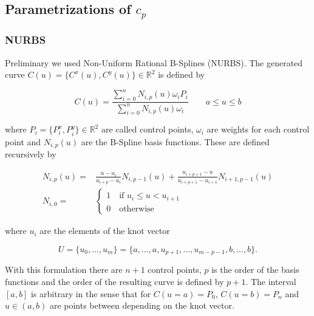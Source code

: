 \documentclass{scrartcl}[12pt, halfparskip]
\numberwithin{equation}{section}
\numberwithin{figure}{section}
\numberwithin{table}{section}
\begin{document}
\subsection{Parametrizations of $c_p$}
\label{sec:parametrizations}

\subsubsection{NURBS}
\label{sec:nurbs}
Preliminary we used Non-Uniform Rational B-Splines (NURBS). The generated curve $C(u) = \{C^x(u), C^y(u) \} \in \mathbb{R}^2$ is defined by

\begin{equation}
	C(u) = \frac{\sum_{i=0}^{n} N_{i,p}(u) \omega_i P_i }{\sum_{i=0}^{n} N_{i,p}(u) \omega_i} \qquad a \le u \le b
\end{equation}

where $P_i = \{ P_i^x, P_i^y \} \in \mathbb{R}^2$ are called control points, $\omega_i$ are weights for each control point and $N_{i,p}(u)$ are the B-Spline basis functions. These are defined recursively by

\begin{align}
	N_{i,p}(u) = & \frac{u - u_i}{u_{i+p} - u_i} N_{i,p-1}(u) + \frac{u_{i+p+1} - u}{u_{i+p+1} - u_{i+1}} N_{i+1,p-1}(u) \label{eq:NURBS_basis_polynomial} \\[1ex]
	N_{i,0} = &
	\begin{cases}
		1 \quad \text{if } u_i \le u < u_{i+1} \\
		0 \quad \text{otherwise}
	\end{cases} \nonumber
\end{align}

where $u_i$ are the elements of the knot vector

\begin{equation}
	U = \{u_0,...,u_m\}=\{a,...,a,u_{p+1},...,u_{m-p-1},b,...,b\}.
\end{equation}

With this formulation there are $n+1$ control points, $p$ is the order of the basis functions and the order of the resulting curve is defined by $p+1$. The interval $[a,b]$ is arbitrary in the sense that for $C(u=a)=P_0$,  $C(u=b)=P_n$ and $u \in (a,b)$ are points between depending on the knot vector.\\
\end{document}
